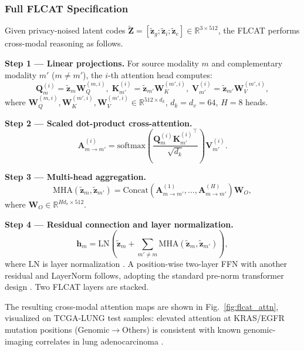 \documentclass[a4paper,fleqn]{cas-dc}
\begin{document}
\subsubsection{Full FLCAT Specification}

Given privacy-noised latent codes
$\tilde{\mathbf{Z}}\!=\![\tilde{\mathbf{z}}_g;\tilde{\mathbf{z}}_i;
\tilde{\mathbf{z}}_e]\!\in\!\mathbb{R}^{3\times 512}$, the FLCAT performs
cross-modal reasoning as follows.

\textbf{Step 1 — Linear projections.} For source modality $m$ and
complementary modality $m'$ ($m\!\neq\!m'$), the $i$-th attention head
computes:
\begin{equation}
\mathbf{Q}_m^{(i)} = \tilde{\mathbf{z}}_m \mathbf{W}_Q^{(m,i)},\;
\mathbf{K}_{m'}^{(i)} = \tilde{\mathbf{z}}_{m'}\mathbf{W}_K^{(m',i)},\;
\mathbf{V}_{m'}^{(i)} = \tilde{\mathbf{z}}_{m'}\mathbf{W}_V^{(m',i)},
\label{eq:proj}
\end{equation}
where $\mathbf{W}_Q^{(m,i)}, \mathbf{W}_K^{(m',i)},
\mathbf{W}_V^{(m',i)}\!\in\!\mathbb{R}^{512\times d_k}$,
$d_k\!=\!d_v\!=\!64$, $H\!=\!8$ heads.

\textbf{Step 2 — Scaled dot-product cross-attention.}
\begin{equation}
\mathbf{A}^{(i)}_{m\to m'} =
\mathrm{softmax}\!\left(\frac{\mathbf{Q}_m^{(i)}
{\mathbf{K}_{m'}^{(i)}}^\top}{\sqrt{d_k}}\right)\mathbf{V}_{m'}^{(i)}.
\label{eq:attn}
\end{equation}

\textbf{Step 3 — Multi-head aggregation.}
\begin{equation}
\mathrm{MHA}(\tilde{\mathbf{z}}_m,\tilde{\mathbf{z}}_{m'}) =
\mathrm{Concat}\!\left(\mathbf{A}^{(1)}_{m\to m'},\ldots,
\mathbf{A}^{(H)}_{m\to m'}\right)\!\mathbf{W}_O,
\label{eq:mha}
\end{equation}
where $\mathbf{W}_O\!\in\!\mathbb{R}^{Hd_v\times 512}$.

\textbf{Step 4 — Residual connection and layer normalization.}
\begin{equation}
\mathbf{h}_m = \mathrm{LN}\!\left(\tilde{\mathbf{z}}_m +
\sum_{m'\neq m}\mathrm{MHA}(\tilde{\mathbf{z}}_m,\tilde{\mathbf{z}}_{m'})
\right),
\label{eq:res}
\end{equation}
where $\mathrm{LN}$ is layer normalization \citep{ba2016layernorm}. A
position-wise two-layer FFN with another residual and LayerNorm follows,
adopting the standard pre-norm transformer design \citep{xiong2020prenorm}.
Two FLCAT layers are stacked.

The resulting cross-modal attention maps are shown in Fig.~\ref{fig:flcat_attn},
visualized on TCGA-LUNG test samples: elevated attention at KRAS/EGFR mutation
positions (Genomic$\to$Others) is consistent with known genomic-imaging
correlates in lung adenocarcinoma \citep{huang2021multimodal}.
\end{document}
